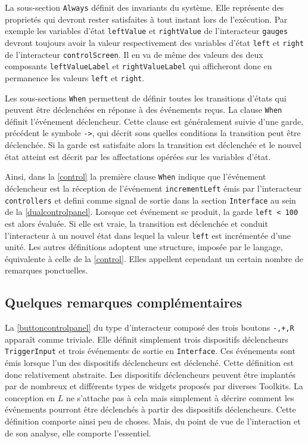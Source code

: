 \documentclass{ihm}
\begin{document}
La   sous-section  \lstinline$Always$   définit   des  invariants   du
système. Elle représente des proprietés qui devront rester satisfaites
à tout instant  lors de l'exécution. Par exemple  les variables d'état
\lstinline$leftValue$   et  \lstinline$rightValue$   de  l'interacteur
\lstinline$gauges$ devront toujours avoir la valeur respectivement des
variables    d'état   \lstinline$left$    et   \lstinline$right$    de
l'interacteur \lstinline$controlScreen$. Il en  va de même des valeurs
des      deux       composants      \lstinline$leftValueLabel$      et
\lstinline$rightValueLabel$  qui afficheront  donc  en permanence  les
valeurs \lstinline$left$ et \lstinline$right$. 

Les sous-sections  \lstinline$When$ permettent  de définir  toutes les
transitions  d'états qui  peuvent être  déclenchées en  réponse à  des
événements  reçus.   La  clause \lstinline$When$  définit  l'événement
déclencheur.  Cette  clause  est   généralement  suivie  d'une  garde,
précédent  le   symbole  \lstinline$->$,   qui  décrit   sous  quelles
conditions  la  transition peut  être  déclenchée.   Si la  garde  est
satisfaite  alors  la transition  est  déclenchée  et le  nouvel  état
atteint  est décrit  par les  affectations opérées  sur les  variables
d'état.

Ainsi, dans  la \autoref{control} la première  clause \lstinline$When$
indique que  l'événement déclencheur  est la réception  de l'événement
\lstinline$incrementLeft$        émis         par        l'interacteur
\lstinline$controllers$  et  defini comme  signal  de  sortie dans  la
section      \lstinline$Interface$       au      sein       de      la
\autoref{dualcontrolpanel}. Lorsque cet événement se produit, la garde
\lstinline$left < 100$  est  alors  évaluée. Si  elle  est vraie,  la
transition est  déclenchée et conduit  l'interacteur à un  nouvel état
dans lequel  la valeur  \lstinline$left$ est incrémentée  d'une unité.
Les autres définitions adoptent une structure, imposée par le langage,
équivalente à celle de la \autoref{control}. Elles appellent cependant
un certain nombre de remarques ponctuelles.


\subsection{Quelques remarques complémentaires}
\label{sec:remarques}

La  \autoref{buttoncontrolpanel}  du  type d'interacteur  composé  des
trois  boutons \texttt{-,+,R}  apparaît comme  triviale. Elle  définit
simplement trois dispositifs  déclencheurs \lstinline$TriggerInput$ et
trois événements  de sortie en \lstinline$Interface$.   Ces événements
sont  émis lorsque  l'un des  dispositifs déclencheurs  est déclenché.
Cette  définition est  donc relativement  abstraite.  Les  dispositifs
déclencheurs  peuvent être  implantés  par de  nombreux et  différents
types de widgets proposés par  diverses Toolkits. La conception en $L$
ne  s'attache  pas  à  cela  mais simplement  à  décrire  comment  les
événements  pourront   être  déclenchés   à  partir   des  dispositifs
déclencheurs. Cette définition comporte ainsi  peu de choses. Mais, du
point  de  vue de  l'interaction  et  de  son analyse,  elle  comporte
l'essentiel.
\end{document}
